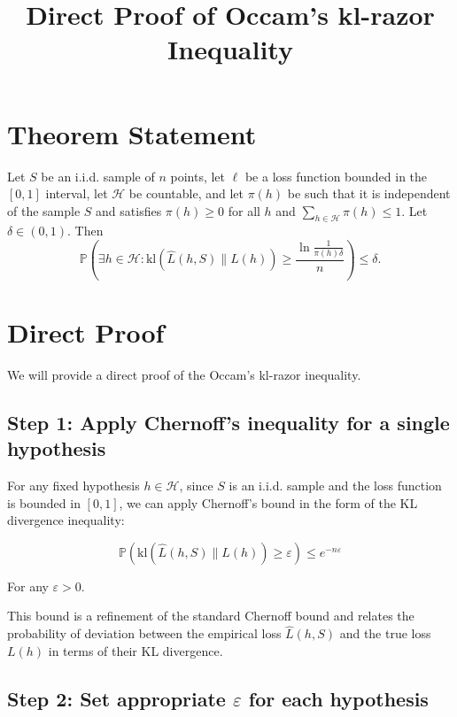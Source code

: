 \documentclass{article}
\title{Direct Proof of Occam's kl-razor Inequality}
\author{}
\date{}
\begin{document}
\maketitle

\section{Theorem Statement}
\begin{theorem}
Let $S$ be an i.i.d. sample of $n$ points, let $\ell$ be a loss function bounded in the $[0, 1]$ interval, let $\mathcal{H}$ be countable, and let $\pi(h)$ be such that it is independent of the sample $S$ and satisfies $\pi(h) \geq 0$ for all $h$ and $\sum_{h\in\mathcal{H}} \pi(h) \leq 1$. Let $\delta \in (0,1)$. Then
\begin{equation}
\mathbb{P}\left(\exists h \in \mathcal{H} : \text{kl}(\hat{L}(h, S)\|L(h)) \geq \frac{\ln \frac{1}{\pi(h)\delta}}{n}\right) \leq \delta.
\end{equation}
\end{theorem}

\section{Direct Proof}

We will provide a direct proof of the Occam's kl-razor inequality.

\subsection{Step 1: Apply Chernoff's inequality for a single hypothesis}

For any fixed hypothesis $h \in \mathcal{H}$, since $S$ is an i.i.d. sample and the loss function is bounded in $[0,1]$, we can apply Chernoff's bound in the form of the KL divergence inequality:

\begin{equation}
\mathbb{P}(\text{kl}(\hat{L}(h,S)\|L(h)) \geq \varepsilon) \leq e^{-n\varepsilon}
\end{equation}

For any $\varepsilon > 0$.

This bound is a refinement of the standard Chernoff bound and relates the probability of deviation between the empirical loss $\hat{L}(h,S)$ and the true loss $L(h)$ in terms of their KL divergence.

\subsection{Step 2: Set appropriate $\varepsilon$ for each hypothesis}
\end{document}
